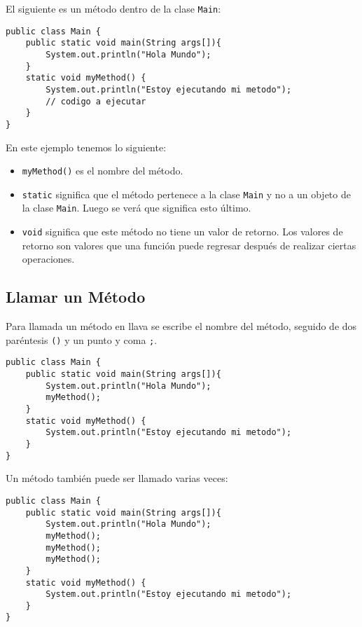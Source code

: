 \documentclass[12pt]{article}
\theoremstyle{largebreak}
\begin{document}
    \begin{exa}
        El siguiente es un método dentro de la clase \lstinline|Main|:
        \begin{lstlisting}[caption={Método dentro de \lstinline|Main|.},label=DescriptiveLabel]
public class Main {
    public static void main(String args[]){
        System.out.println("Hola Mundo");
    }
    static void myMethod() {
        System.out.println("Estoy ejecutando mi metodo");
        // codigo a ejecutar
    }
}
        \end{lstlisting}
        En este ejemplo tenemos lo siguiente:
        \begin{itemize}
            \item \lstinline|myMethod()| es el nombre del método.
            \item \lstinline|static| significa que el método pertenece a la clase \lstinline|Main| y no a un objeto de la clase \lstinline|Main|. Luego se verá que significa esto último.
            \item \lstinline|void| significa que este método no tiene un valor de retorno. Los valores de retorno son valores que una función puede regresar después de realizar ciertas operaciones.
        \end{itemize}
    \end{exa}

    \subsection{Llamar un Método}

    Para llamada un método en llava se escribe el nombre del método, seguido de dos paréntesis \lstinline|()| y un punto y coma \lstinline|;|.

    \begin{exa}
        \begin{lstlisting}[caption={Método dentro de \lstinline|Main|.},label=DescriptiveLabel]
public class Main {
    public static void main(String args[]){
        System.out.println("Hola Mundo");
        myMethod();
    }
    static void myMethod() {
        System.out.println("Estoy ejecutando mi metodo");
    }
}
        \end{lstlisting}

        Un método también puede ser llamado varias veces:
        \begin{lstlisting}[caption={Método llamado varias veces.},label=DescriptiveLabel]
public class Main {
    public static void main(String args[]){
        System.out.println("Hola Mundo");
        myMethod();
        myMethod();
        myMethod();
    }
    static void myMethod() {
        System.out.println("Estoy ejecutando mi metodo");
    }
}
        \end{lstlisting}
    \end{exa}
\end{document}
